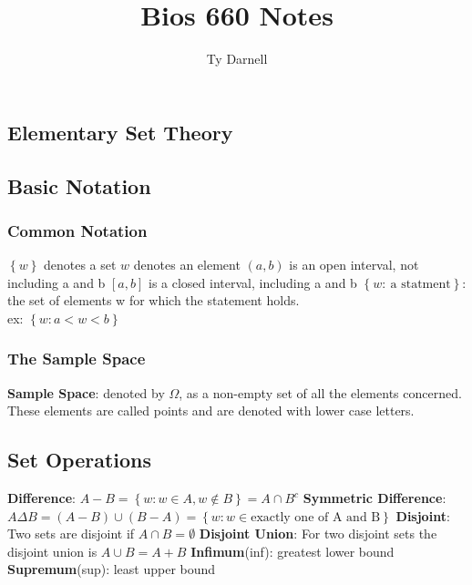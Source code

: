 \documentclass[openany]{book}
\title{Bios 660 Notes}
\author{Ty Darnell}
\date{ }
\numberwithin{equation}{section}
\begin{document}
\tableofcontents
\begin{flushleft}
\chapter{Elementary Set Theory}
\section{Basic Notation}
\subsection{Common Notation}
$\left\{w\right\}$ denotes a set\medbreak
$w$ denotes an element \medbreak
$(a,b)$ is an open interval, not including a and b \medbreak
$[a,b]$ is a closed interval, including a and b \medbreak
$\left\{w: \ \text{a statment}\right\}$: the set of elements w for which the statement holds.\\
ex: $\left\{w:a<w<b\right\}$
\subsection{The Sample Space}
\textbf{Sample Space}: denoted by $\Omega$, as a non-empty set of all the elements concerned. These elements are called points
and are denoted with lower case letters. \medbreak
\section{Set Operations}
\textbf{Difference}: $A-B=\left\{w:w\in A, w \notin B \right\}=A\cap B^c$ \medbreak
\textbf{Symmetric Difference}: $A\Delta B=(A-B)\cup (B-A)=\left\{w:w\in \text{exactly one of A and B} \right\}$ \medbreak
\textbf{Disjoint}: Two sets are disjoint if $A \cap B=\emptyset$ \medbreak
\textbf{Disjoint Union}: For two disjoint sets the disjoint union is $A \cup B=A+B$
\textbf{Infimum}(inf): greatest lower bound \medbreak
\textbf{Supremum}(sup): least upper bound \medbreak



\end{flushleft}
\end{document}
